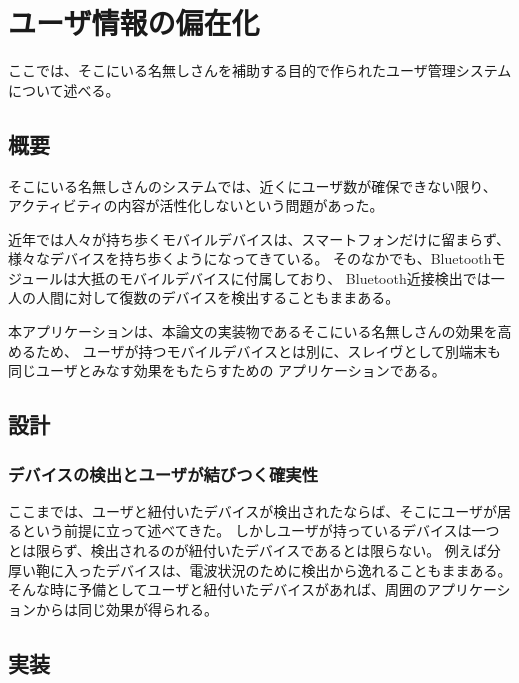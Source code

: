 \chapter{ユーザ情報の偏在化}\label{chap:implementation_2}

ここでは、そこにいる名無しさんを補助する目的で作られたユーザ管理システムについて述べる。

\newpage

\section{概要}

そこにいる名無しさんのシステムでは、近くにユーザ数が確保できない限り、
アクティビティの内容が活性化しないという問題があった。

近年では人々が持ち歩くモバイルデバイスは、スマートフォンだけに留まらず、様々なデバイスを持ち歩くようになってきている。
そのなかでも、Bluetoothモジュールは大抵のモバイルデバイスに付属しており、
Bluetooth近接検出では一人の人間に対して復数のデバイスを検出することもままある。

本アプリケーションは、本論文の実装物であるそこにいる名無しさんの効果を高めるため、
ユーザが持つモバイルデバイスとは別に、スレイヴとして別端末も同じユーザとみなす効果をもたらすための
アプリケーションである。


\newpage

\section{設計}

\subsection{デバイスの検出とユーザが結びつく確実性}

ここまでは、ユーザと紐付いたデバイスが検出されたならば、そこにユーザが居るという前提に立って述べてきた。
しかしユーザが持っているデバイスは一つとは限らず、検出されるのが紐付いたデバイスであるとは限らない。
例えば分厚い鞄に入ったデバイスは、電波状況のために検出から逸れることもままある。
そんな時に予備としてユーザと紐付いたデバイスがあれば、周囲のアプリケーションからは同じ効果が得られる。



\newpage

\section{実装}

